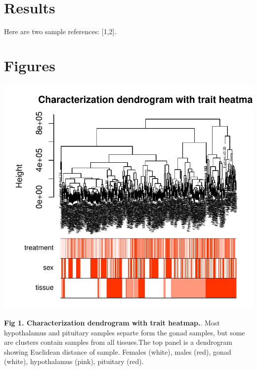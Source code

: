 \documentclass[10pt,letterpaper]{article}
\begin{document}
\hypertarget{results}{%
\section{Results}\label{results}}

Here are two sample references: {[}1,2{]}.

\hypertarget{figures}{%
\section{Figures}\label{figures}}

\includegraphics{manuscript_draft_files/figure-latex/wgcna-1.pdf}

\textbf{Fig 1. Characterization dendrogram with trait heatmap.}. Most
hypothalamus and pituitary samples separte form the gonad samples, but
some are clusters contain samples from all tissues.The top panel is a
dendrogram showing Euclidean distance of sample. Females (white), males
(red), gonad (white), hypothalamus (pink), pituitary (red).
\end{document}
